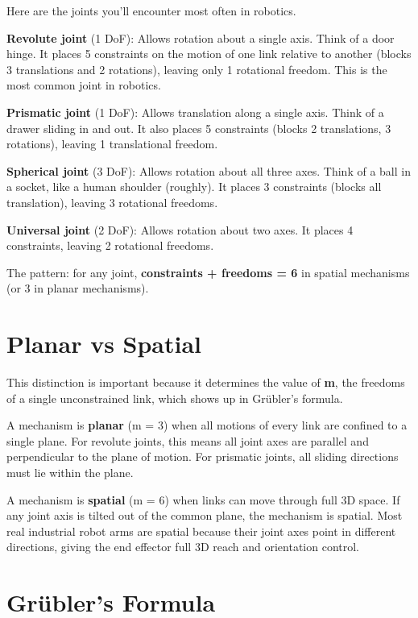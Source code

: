 \documentclass{article}
\begin{document}
Here are the joints you'll encounter most often in robotics.

\textbf{Revolute joint} (1 DoF): Allows rotation about a single axis. Think of a door hinge. It places 5 constraints on the motion of one link relative to another (blocks 3 translations and 2 rotations), leaving only 1 rotational freedom. This is the most common joint in robotics.

\textbf{Prismatic joint} (1 DoF): Allows translation along a single axis. Think of a drawer sliding in and out. It also places 5 constraints (blocks 2 translations, 3 rotations), leaving 1 translational freedom.

\textbf{Spherical joint} (3 DoF): Allows rotation about all three axes. Think of a ball in a socket, like a human shoulder (roughly). It places 3 constraints (blocks all translation), leaving 3 rotational freedoms.

\textbf{Universal joint} (2 DoF): Allows rotation about two axes. It places 4 constraints, leaving 2 rotational freedoms.

The pattern: for any joint, \textbf{constraints + freedoms = 6} in spatial mechanisms (or 3 in planar mechanisms).

\section{Planar vs Spatial}

This distinction is important because it determines the value of \textbf{m}, the freedoms of a single unconstrained link, which shows up in Gr\"{u}bler's formula.

A mechanism is \textbf{planar} (m = 3) when all motions of every link are confined to a single plane. For revolute joints, this means all joint axes are parallel and perpendicular to the plane of motion. For prismatic joints, all sliding directions must lie within the plane.

A mechanism is \textbf{spatial} (m = 6) when links can move through full 3D space. If any joint axis is tilted out of the common plane, the mechanism is spatial. Most real industrial robot arms are spatial because their joint axes point in different directions, giving the end effector full 3D reach and orientation control.

\section{Gr\"{u}bler's Formula}
\end{document}
